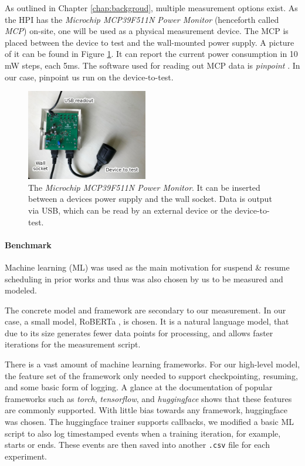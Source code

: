 As outlined in Chapter \ref{chap:backgroud}, multiple measurement options exist. 
As the HPI has the \emph{Microchip MCP39F511N Power Monitor} (henceforth called \emph{MCP}) on-site, one will be used as a physical measurement device.
The MCP is placed between the device to test and the wall-mounted power supply. 
A picture of it can be found in Figure \ref{fig:mcp}. 
It can report the current power consumption in 10 mW steps, each 5ms. 
The software used for reading out MCP data is \emph{pinpoint} \cite{kohler_pinpoint_2020}.
In our case, pinpoint us run on the device-to-test.

\begin{figure}
    \centering
    \includegraphics[width=200px]{images/mcp_graphic_design_is_my_passion.jpg}
    \caption[short]{The \emph{Microchip MCP39F511N Power Monitor}. It can be inserted between a devices power supply and the wall socket. Data is output via USB, which can be read by an external device or the device-to-test.}
    \label{fig:mcp}
\end{figure}


\paragraph{Benchmark}

Machine learning (ML) was used as the main motivation for suspend \& resume scheduling in prior works \cite {wiesner_lets_2021} and thus was also chosen by us to be measured and modeled. 

The concrete model and framework are secondary to our measurement. 
In our case, a small model, RoBERTa , is chosen.
It is a natural language model, that due to its size generates fewer data points for processing, and allows faster iterations for the measurement script. 

There is a vast amount of machine learning frameworks. 
For our high-level model, the feature set of the framework only needed to support checkpointing, resuming, and some basic form of logging. 
A glance at the documentation of popular frameworks such as \emph{torch}, \emph{tensorflow}, and \emph{huggingface} shows that these features are commonly supported. 
With little bias towards any framework, huggingface was chosen.
The huggingface trainer supports callbacks, we modified a basic ML script to also log timestamped events when a training iteration, for example, starts or ends. 
These events are then saved into another \verb|.csv| file for each experiment.

